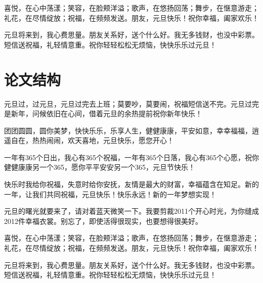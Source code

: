 喜悦，在心中荡漾；笑容，在脸颊洋溢；歌声，在悠扬回荡；舞步，在惬意游走；礼花，在尽情绽放；祝福，在频频发送。朋友，元旦快乐！祝你幸福，阖家欢乐！

元旦将来到，我心费思量。朋友关系好，送个什么好。我无多钱财，也没中彩票。短信送祝福，礼轻情意重。祝你轻轻松松无烦恼，快快乐乐过元旦！

\section{论文结构}

元旦过，过元旦，元旦过完去上班；莫要吵，莫要闹，祝福短信送不完。元旦过完是新年，问候依旧在心间，借着元旦的余热提前祝你新年快乐！

团团圆圆，圆你美梦，快快乐乐，乐享人生，健健康康，平安如意，幸幸福福，逍遥自在，热热闹闹，欢天喜地，元旦快乐，愿您开心！

一年有365个日出，我心有365个祝福，一年有365个日落，我心有365个心愿，祝你健健康康另一个365，愿你平平安安另一个365，元旦节快乐！

快乐时我给你祝福，失意时给你安抚，友情是最大的财富，幸福蕴含在知足。新的一年，让我们共同祝福，元旦快乐！快乐永远！新的一年梦想实现！

元旦的曙光就要来了，请对着蓝天微笑一下。我要剪裁2011个开心时光，为你缝成2012件幸福衣裳。别忘了，即使活得很现实，也要想得很美好。

喜悦，在心中荡漾；笑容，在脸颊洋溢；歌声，在悠扬回荡；舞步，在惬意游走；礼花，在尽情绽放；祝福，在频频发送。朋友，元旦快乐！祝你幸福，阖家欢乐！

元旦将来到，我心费思量。朋友关系好，送个什么好。我无多钱财，也没中彩票。短信送祝福，礼轻情意重。祝你轻轻松松无烦恼，快快乐乐过元旦！




